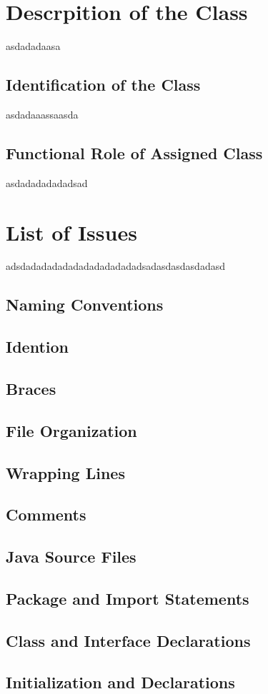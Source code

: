 \documentclass[a4paper,10pt]{article}
\begin{document}
\section{Descrpition of the Class}asdadadaasa
\subsection{Identification of the Class}asdadaaassaasda
\subsection{Functional Role of Assigned Class}asdadadadadadsad
\section{List of Issues}adsdadadadadadadadadadadadsadasdasdasdadasd
\subsection{Naming Conventions}
\subsection{Idention}
\subsection{Braces}
\subsection{File Organization}
\subsection{Wrapping Lines}
\subsection{Comments}
\subsection{Java Source Files}
\subsection{Package and Import Statements}
\subsection{Class and Interface Declarations}
\subsection{Initialization and Declarations}
\end{document}
